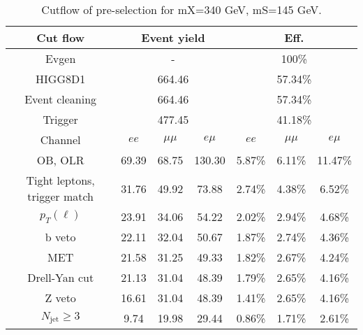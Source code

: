 \begin{table}
\centering\small
\begin{tabular}{c|ccc|ccc}
\hline
\hline
Cut flow &\multicolumn{3}{c|}{Event yield}&\multicolumn{3}{c}{Eff.}      \\
\hline
Evgen&\multicolumn{3}{c|}{-}&\multicolumn{3}{c}{100\%}\\
HIGG8D1&\multicolumn{3}{c|}{664.46}&\multicolumn{3}{c}{57.34\%}\\
Event cleaning&\multicolumn{3}{c|}{664.46}&\multicolumn{3}{c}{57.34\%}\\
Trigger&\multicolumn{3}{c|}{477.45    }&\multicolumn{3}{c}{41.18\%}\\
Channel&$ee$&$\mu\mu$&$e\mu$&$ee$&$\mu\mu$&$e\mu$\\
\hline
OB, OLR    &69.39    &68.75    &130.30& 5.87\%    &6.11\%    &11.47\%\\
Tight leptons, trigger match    &31.76    &49.92    &73.88    &2.74\%    &4.38\%    &6.52\%\\
$p_T(\ell)$    &23.91    &34.06    &54.22    &2.02\%    &2.94\%    &4.68\%\\
b veto    &22.11    &32.04    &50.67    &1.87\%    &2.74\%    &4.36\%\\
MET    &21.58    &31.25    &49.33    &1.82\%    &2.67\%    &4.24\%\\
Drell-Yan cut    &21.13    &31.04    &48.39    &1.79\%    &2.65\%    &4.16\%\\
Z veto    &16.61    &31.04    &48.39    &1.41\%    &2.65\%    &4.16\%\\
$N_{\text{jet}}\geq3$    &9.74    &19.98    &29.44    &0.86\%    &1.71\%    &2.61\%\\
\hline
\hline
\end{tabular}
\caption{Cutflow of pre-selection for mX=340 GeV, mS=145 GeV.}
\label{tab:cut_flow_preselection_mX260}
\end{table}
